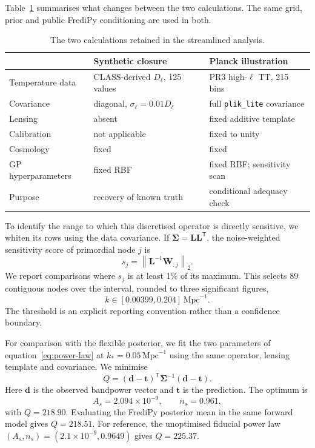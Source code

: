 \documentclass[11pt,a4paper]{article}
\newcommand{\Mpc}{\mathrm{Mpc}}
\newcommand{\trans}{\mathsf T}
\begin{document}
Table~\ref{tab:setups} summarises what changes between the two calculations.
The same grid, prior and public FrediPy conditioning are used in both.

\begin{table}[htb]
\centering
\caption{The two calculations retained in the streamlined analysis.}
\label{tab:setups}
\small
\begin{tabular}{lll}
\toprule
 & Synthetic closure & Planck illustration \\
\midrule
Temperature data & CLASS-derived $D_\ell$, 125 values & PR3 high-$\ell$ TT, 215 bins \\
Covariance & diagonal, $\sigma_\ell=0.01D_\ell$ & full \texttt{plik\_lite} covariance \\
Lensing & absent & fixed additive template \\
Calibration & not applicable & fixed to unity \\
Cosmology & fixed & fixed \\
GP hyperparameters & fixed RBF & fixed RBF; sensitivity scan \\
Purpose & recovery of known truth & conditional adequacy check \\
\bottomrule
\end{tabular}
\end{table}

To identify the range to which this discretised operator is directly
sensitive, we whiten its rows using the data covariance.  If
$\bm\Sigma=\bm L\bm L^\trans$, the noise-weighted sensitivity score of
primordial node $j$ is
\begin{equation}
 s_j=\left\|\bm L^{-1}\bm W_{:j}\right\|_2.
 \label{eq:sensitivity}
\end{equation}
We report comparisons where $s_j$ is at least 1\% of its maximum.  This selects
89 contiguous nodes over the interval, rounded to three significant figures,
\begin{equation}
 k\in[0.00399,0.204]\,\Mpc^{-1}.
\label{eq:planck-range}
\end{equation}
The threshold is an explicit reporting convention rather than a confidence
boundary.

For comparison with the flexible posterior, we fit the two parameters of
equation~\eqref{eq:power-law} at $k_*=0.05\,\Mpc^{-1}$ using the same operator,
lensing template and covariance.  We minimise
\begin{equation}
 Q=(\bm d-\bm t)^\trans\bm\Sigma^{-1}(\bm d-\bm t).
 \label{eq:q}
\end{equation}
Here $\bm d$ is the observed bandpower vector and $\bm t$ is the prediction.
The optimum is
\begin{equation}
 A_s=2.094\times10^{-9},\qquad n_s=0.961,
 \label{eq:planck-power-law}
\end{equation}
with $Q=218.90$.  Evaluating the FrediPy posterior mean in the same forward
model gives $Q=218.51$.  For reference, the unoptimised fiducial power law
$(A_s,n_s)=(2.1\times10^{-9},0.9649)$ gives $Q=225.37$.
\end{document}
